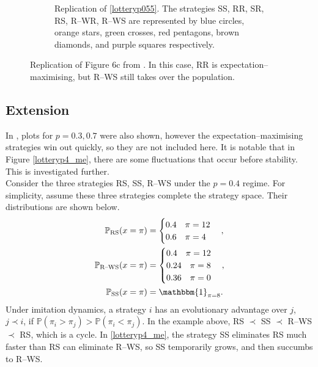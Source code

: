 \begin{figure}[!h]
\begin{subfigure}[b]{0.45\textwidth}
    \caption{Replication of \ref{lotteryp055}. The strategies SS, RR, SR, RS, R--WR, R--WS are represented by blue circles, orange stars, green crosses, red pentagons, brown diamonds, and purple squares respectively. }
    \label{lotteryp4_me_2}
  \end{subfigure}
  \caption{Replication of Figure 6c from \cite{RN30}. In this case, RR is expectation--maximising, but R--WS still takes over the population.} \label{lottery_comp5}
\end{figure} 
\FloatBarrier

\subsection{Extension}
In \cite{RN30}, plots for $p=0.3, 0.7$ were also shown, however the expectation--maximising strategies win out quickly, so they are not included here. It is notable that in Figure \ref{lotteryp4_me}, there are some fluctuations that occur before stability. This is investigated further. \\

Consider the three strategies RS, SS, R--WS under the $p=0.4$ regime. For simplicity, assume these three strategies complete the strategy space. Their distributions are shown below. \\
\begin{align*}
    \mathbb P_{\text{RS}}(x = \pi)  &= \begin{cases} 0.4 \quad \pi = 12 \\
    0.6 \quad \pi =4 
    \end{cases}, \\
        \mathbb P_{\text{R--WS}}(x = \pi)  &= \begin{cases} 0.4 \quad \pi = 12 \\
    0.24 \quad \pi =8 \\
    0.36 \quad \pi = 0\\
    \end{cases}, \\
    \mathbb P_{\text{SS}}(x = \pi)  &= \mathbbm{1}_{\pi = 8}.
\end{align*}
Under imitation dynamics, a strategy $i$ has an evolutionary advantage over $j$, $j \prec i$, if $\mathbb P(\pi_i > \pi_j) > \mathbb P(\pi_i < \pi_j)$. In the example above, RS $\prec$ SS $\prec$ R--WS $\prec$ RS, which is a cycle. In \ref{lotteryp4_me}, the strategy SS eliminates RS much faster than RS can eliminate R--WS, so SS temporarily grows, and then succumbs to R--WS. \\

